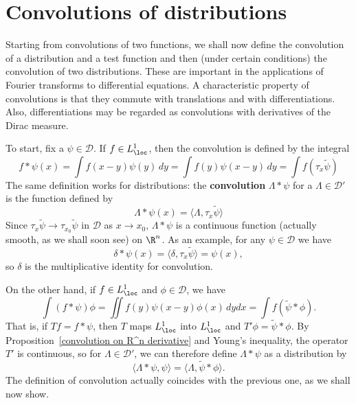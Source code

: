 \section{Convolutions of distributions}
Starting from convolutions of two functions, we shall now define the convolution of a distribution and a test function and then (under certain conditions) the convolution of two distributions. These are important in the applications of Fourier transforms to differential equations. A characteristic property of convolutions is that they commute with translations and with differentiations. Also, differentiations may be regarded as convolutions with derivatives of the Dirac measure.\par
To start, fix a $\psi\in\mathscr{D}$. If $f\in L^1_{\loc}$, then the convolution is defined by the integral
\[f\ast\psi(x)=\int f(x-y)\psi(y)\,dy=\int f(y)\psi(x-y)\,dy=\int f(\tau_{x}\tilde{\psi})\]
The same definition works for distributions: the \textbf{convolution} $\Lambda\ast\psi$ for a $\Lambda\in\mathscr{D}'$ is the function defined by
\[\Lambda\ast\psi(x)=\langle\Lambda,\tau_x\tilde{\psi}\rangle\]
Since $\tau_{x}\tilde{\psi}\to\tau_{x_0}\tilde{\psi}$ in $\mathscr{D}$ as $x\to x_0$, $\Lambda\ast\psi$ is a continuous function (actually smooth, as we shall soon see) on $\R^n$. As an example, for any $\psi\in\mathscr{D}$ we have
\[\delta\ast\psi(x)=\langle\delta,\tau_x\tilde{\psi}\rangle=\psi(x),\]
so $\delta$ is the multiplicative identity for convolution.\par
On the other hand, if $f\in L^1_{\loc}$ and $\phi\in\mathscr{D}$, we have
\[\int(f\ast\psi)\phi=\iint f(y)\psi(x-y)\phi(x)\,dydx=\int f(\tilde{\psi}\ast\phi).\]
That is, if $Tf=f\ast\psi$, then $T$ maps $L^1_{\loc}$ into $L^1_{\loc}$ and $T'\phi=\tilde{\psi}\ast\phi$. By Proposition~\ref{convolution on R^n derivative} and Young's inequality, the operator $T'$ is continuous, so for $\Lambda\in\mathscr{D}'$, we can therefore define $\Lambda\ast\psi$ as a distribution by
\[\langle\Lambda\ast\psi,\psi\rangle=\langle\Lambda,\tilde{\psi}\ast\phi\rangle.\]
The definition of convolution actually coincides with the previous one, as we shall now show.
